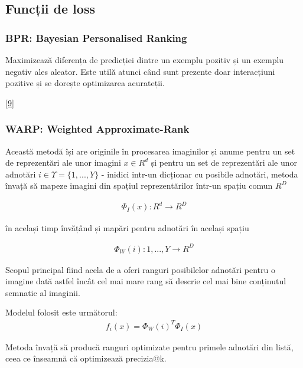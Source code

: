 \subsection{Funcții de loss}

\subsubsection*{BPR: Bayesian Personalised Ranking}

Maximizează diferența de predicției dintre un exemplu pozitiv și un exemplu negativ ales aleator. Este utilă atunci când sunt prezente doar interacțiuni pozitive și se dorește optimizarea acurateții.

\hyperlink{SteffenRendleChristophFreudenthalerZenoGantnerLarsSchmidtThieme}{[9]}

\subsubsection*{WARP: Weighted Approximate-Rank}

Această metodă își are originile în procesarea imaginilor și anume pentru un set de reprezentări ale unor imagini $x \in R^d$ și pentru un set de reprezentări ale unor adnotări $i \in \Upsilon = \{1, ..., Y\}$ - inidici intr-un dicționar cu posibile adnotări, metoda învață să mapeze imagini din spațiul reprezentărilor într-un spațiu comun $R^D$

\begin{align}
	\Phi_{I}(x):R^d \rightarrow R^D
\end{align}

în același timp învățând și mapări pentru adnotări în același spațiu

\begin{align}
	\Phi_{W}(i):{1,...,Y} \rightarrow R^D
\end{align}

Scopul principal fiind acela de a oferi ranguri posibilelor adnotări pentru o imagine dată astfel încât cel mai mare rang să descrie cel mai bine conținutul semnatic al imaginii. 

Modelul folosit este următorul:
\begin{align}
	f_{i}(x) = \Phi_{W}(i)^T \Phi_{I}(x)
\end{align}

Metoda învață să producă ranguri optimizate pentru primele adnotări din listă, ceea ce înseamnă că optimizează precizia@k.


